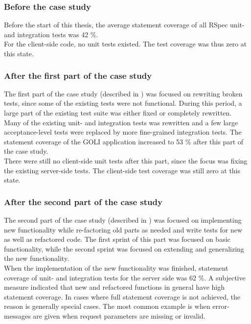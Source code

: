 \subsubsection{Before the case study}

Before the start of this thesis, the average statement coverage
of all RSpec unit- and integration tests was 42 \%.\\

For the client-side code, no unit tests existed. The test coverage was
thus zero at this state.\\


\subsubsection{After the first part of the case study}

The first part of the case study (described in )
was focused on rewriting broken tests, since some of the existing tests
were not functional. During this period, a large part of the existing
test suite was either fixed or completely rewritten. Many of the
existing unit- and integration tests was rewritten and a few large
acceptance-level tests were replaced by more fine-grained integration
tests. The statement coverage of the GOLI application increased to 53 \%
after this part of the case study.\\

There were still no client-side unit tests after this part, since the
focus was fixing the existing server-side tests. The client-side test
coverage was still zero at this state.\\

\subsubsection{After the second part of the case study}
\label{sec:result_coverage_end}

The second part of the case study (described in )
was focused on implementing new functionality while re-factoring old
parts as needed and write tests for new as well as refactored code. The
first sprint of this part was focused on basic functionality, while the
second sprint was focused on extending and generalizing the new
functionality.\\

When the implementation of the new functionality was finished, statement
coverage of unit- and integration tests for the server side was 62 \%. A
subjective measure indicated that new and refactored functions in
general have high statement coverage. In cases where full statement
coverage is not achieved, the reason is generally special cases. The
most common example is when error-messages are given when request
parameters are missing or invalid.\\

